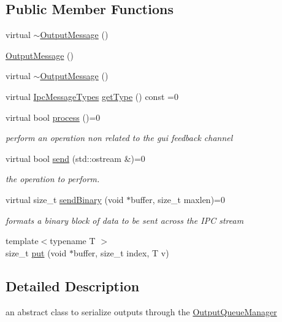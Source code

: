 \subsection*{Public Member Functions}
\begin{DoxyCompactItemize}
\item 
virtual \mbox{\hyperlink{class_output_message_ae7e1f9d8461918318b3666466a8ee913}{$\sim$\+Output\+Message}} ()
\item 
\mbox{\hyperlink{class_output_message_afd40d58fe0b00e66e9e9ccb14027c5ab}{Output\+Message}} ()
\item 
virtual \mbox{\hyperlink{class_output_message_ae7e1f9d8461918318b3666466a8ee913}{$\sim$\+Output\+Message}} ()
\item 
virtual \mbox{\hyperlink{ipcmsgtypes_8h_a59f75a61492e64aebfae0cc49cc26683}{Ipc\+Message\+Types}} \mbox{\hyperlink{class_output_message_adfc965910862cd236e437e3050aee176}{get\+Type}} () const =0
\item 
virtual bool \mbox{\hyperlink{class_output_message_a949d8350d98202608e4248fe6dafa10f}{process}} ()=0
\begin{DoxyCompactList}\small\item\em perform an operation non related to the gui feedback channel \end{DoxyCompactList}\item 
virtual bool \mbox{\hyperlink{class_output_message_a6f817de4d3430dc98521431385b95328}{send}} (std\+::ostream \&)=0
\begin{DoxyCompactList}\small\item\em the operation to perform. \end{DoxyCompactList}\item 
virtual size\+\_\+t \mbox{\hyperlink{class_output_message_a42e0a2560b1bf9e58b6626056f87b8c2}{send\+Binary}} (void $\ast$buffer, size\+\_\+t maxlen)=0
\begin{DoxyCompactList}\small\item\em formats a binary block of data to be sent across the I\+PC stream \end{DoxyCompactList}\item 
{\footnotesize template$<$typename T $>$ }\\size\+\_\+t \mbox{\hyperlink{class_output_message_a3cdeed110f7abc0f23c2c50d28b1db6d}{put}} (void $\ast$buffer, size\+\_\+t index, T v)
\end{DoxyCompactItemize}


\subsection{Detailed Description}
an abstract class to serialize outputs through the \mbox{\hyperlink{class_output_queue_manager}{Output\+Queue\+Manager}} 



